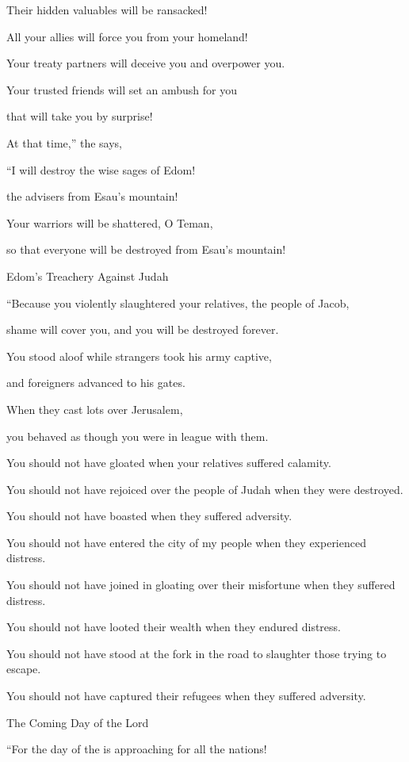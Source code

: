 {\par }{\Q Their hidden valuables
will be ransacked!
\par }{\Q {}All
your allies
will force
you from your homeland!

\par }{\Q Your treaty partners
will deceive
you and overpower
you.
\par }{\Q Your trusted friends will set
an ambush
for
you
\par }{\Q that will take you by surprise!
\par }{\Q {}At that time,”
the {}
says,
\par }{\Q “I will destroy
the wise
sages of Edom!

\par }{\Q the advisers
from Esau’s
mountain!
\par }{\Q {}Your warriors
will be shattered,
O Teman,
\par }{\Q so
that everyone
will be destroyed
from Esau’s
mountain!
\par }{\SH Edom’s Treachery Against Judah
\par }{\Q {}“Because you violently
slaughtered your relatives,
the people of Jacob,
\par }{\Q shame
will cover
you, and you will be destroyed
forever.
\par }{\Q {}You stood
aloof
while strangers
took
his army
captive,
\par }{\Q and foreigners
advanced
to his gates.
\par }{\Q When they cast
lots
over
Jerusalem,
\par }{\Q you behaved as though
you
were in league
with them.
\par }{\Q {}You should not
have gloated
when
your relatives
suffered
calamity.

\par }{\Q You should not
have rejoiced
over the people
of Judah
when
they were destroyed.
\par }{\Q You should not
have boasted
when
they suffered adversity.
\par }{\Q {}You should not
have entered
the city
of my people
when
they experienced distress.
\par }{\Q You should not
have joined in gloating
over their misfortune
when
they suffered distress.
\par }{\Q You should not
have looted
their wealth
when
they endured distress.
\par }{\Q {}You should not
have stood
at
the fork in the road
to slaughter
those trying to escape.
\par }{\Q You should not
have captured
their refugees
when
they suffered adversity.
\par }{\SH The Coming Day of the Lord
\par }{\Q {}“For
the day
of the {}
is approaching
for all
the nations!

}
